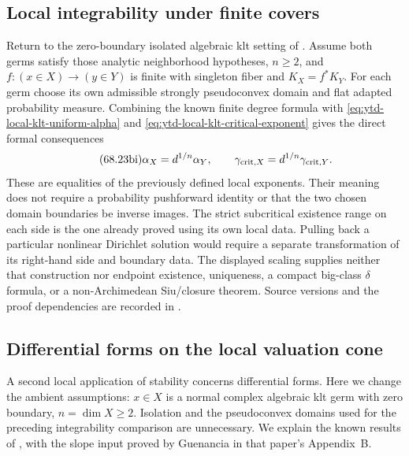 \subsection{Local integrability under finite covers}
\label{sec:ytd-local-klt-finite-thresholds}

Return to the zero-boundary isolated algebraic klt setting of
. Assume both germs satisfy
those analytic neighborhood hypotheses, $n\geq2$, and
$f:(x\in X)\to(y\in Y)$ is finite with singleton fiber
and $K_X=f^*K_Y$. For each germ choose its own admissible
strongly pseudoconvex domain and flat adapted probability
measure. Combining the known finite degree formula with
\eqref{eq:ytd-local-klt-uniform-alpha} and
\eqref{eq:ytd-local-klt-critical-exponent}
gives the direct formal consequences
\[
\tag{68.23bi}\label{eq:ytd-local-klt-finite-thresholds}
 \alpha_X=d^{1/n}\alpha_Y,
 \qquad
 \gamma_{{\rm crit},X}=d^{1/n}\gamma_{{\rm crit},Y}.
\]
These are equalities of the previously defined local exponents.
Their meaning does not require a probability pushforward
identity or that the two chosen domain boundaries be inverse
images. The strict subcritical existence range on each side
is the one already proved using its own local data. Pulling
back a particular nonlinear Dirichlet solution would require
a separate transformation of its right-hand side and boundary
data. The displayed scaling supplies neither that construction
nor endpoint existence, uniqueness, a compact big-class
$\delta$ formula, or a non-Archimedean Siu/closure theorem.
Source versions and the proof dependencies are recorded in
.

\subsection{Differential forms on the local valuation cone}
\label{sec:ytd-local-klt-forms}

A second local application of stability concerns differential forms.
Here we change the ambient assumptions: $x\in X$ is a normal complex
algebraic klt germ with zero boundary, $n=\dim X\geq2$. Isolation and
the pseudoconvex domains used for the preceding integrability comparison
are unnecessary. We explain the known results of
\cite[Sections~3 and~5]{XuZhuang26StableFormsV2}, with the slope input
proved by Guenancia in that paper's Appendix~B.

